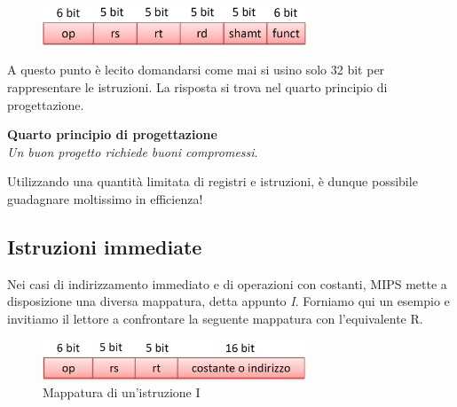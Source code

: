 \documentclass[class=book, crop=false]{standalone}
\begin{document}
\begin{figure}[H]
	\centering
	\includegraphics[width=0.7\textwidth,keepaspectratio]{mappatura.png}
\end{figure}

A questo punto è lecito domandarsi come mai si usino solo 32 bit per rappresentare le istruzioni. La risposta si trova nel quarto principio di progettazione.

\vspace{8pt}
\begin{tcolorbox}
\centering
\textbf{Quarto principio di progettazione}\\
\emph{Un buon progetto richiede buoni compromessi}.
\end{tcolorbox}
\vspace{5pt}

Utilizzando una quantità limitata di registri e istruzioni, è dunque possibile guadagnare moltissimo in efficienza!

\subsection{Istruzioni immediate}
Nei casi di indirizzamento immediato e di operazioni con costanti, MIPS mette a disposizione una diversa mappatura, detta appunto \emph{I}. Forniamo qui un esempio e invitiamo il lettore a confrontare la seguente mappatura con l'equivalente R.
\begin{figure}[H]
	\centering
	\includegraphics[width=0.7\textwidth,keepaspectratio]{I.png}
	\caption{Mappatura di un'istruzione I}
\end{figure}
\end{document}
